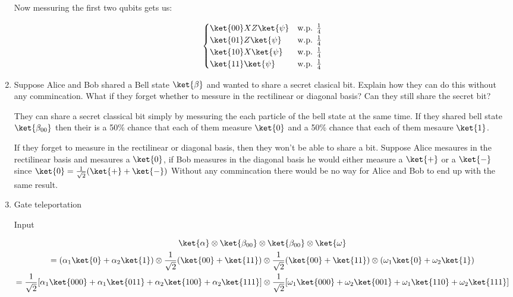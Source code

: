\documentclass[]{article}
\begin{document}
\begin{enumerate}
        Now messuring the first two qubits gets us:

        \[ \begin{cases} 
          \ket{00} XZ\ket{\psi} & \text{w.p. } \frac{1}{4} \\
          \ket{01} Z\ket{\psi} & \text{w.p. } \frac{1}{4} \\
          \ket{10} X\ket{\psi} & \text{w.p. } \frac{1}{4} \\
          \ket{11} \ket{\psi} & \text{w.p. } \frac{1}{4} \\
          \end{cases}
        \]


      \item Suppose Alice and Bob shared a Bell state $\ket{\beta}$ and wanted to share a secret
        clasical bit. Explain how they can do this without any commincation. What if they forget whether
        to messure in the rectilinear or diagonal basis? Can they still share the secret bit?

        They can share a secret classical bit simply by messuring the each particle of the bell state at the same time.
        If they shared bell state $\ket{\beta_{00}}$ then their is a 50\% chance that each of them measure $\ket{0}$
        and a 50\% chance that each of them mesaure $\ket{1}$.

        If they forget to measure in the rectilinear or diagonal basis, then they won't be able to share a bit. Suppose
        Alice mesaures in the rectilinear basis and mesaures a $\ket{0}$, if Bob measures in the diagonal basis 
        he would either measure a $\ket{+}$ or a $\ket{-}$ since $\ket{0} = \frac{1}{\sqrt{2}}(\ket{+} + \ket{-})$
        Without any commincation there would be no way for Alice and Bob to end up with the same result.



      \item Gate teleportation

        Input

        \begin{gather*}
          \ket{\alpha} \otimes \ket{\beta_{00}} \otimes \ket{\beta_{00}} \otimes \ket{\omega}\\
          =(\alpha_1 \ket{0} + \alpha_2 \ket{1}) \otimes \frac{1}{\sqrt{2}}(\ket{00} + \ket{11})
          \otimes \frac{1}{\sqrt{2}}(\ket{00} + \ket{11}) \otimes (\omega_1 \ket{0} + \omega_2 \ket{1})\\
          =\frac{1}{\sqrt{2}}[\alpha_1 \ket{000} + \alpha_1 \ket{011} + \alpha_2 \ket{100} + \alpha_2 \ket{111}]
          \otimes \frac{1}{\sqrt{2}}[\omega_1 \ket{000} + \omega_2 \ket{001} + 
          \omega_1 \ket{110} + \omega_2 \ket{111}]\\
        \end{gather*}


\end{enumerate}
\end{document}
